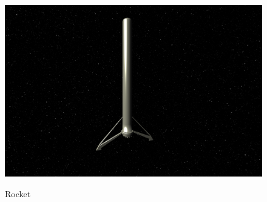 \documentclass[oneside]{article}
\begin{document}
\begin{enumerate}
	      \begin{figure}[b!]
	      	\begin{center}
	      		\label{rocket}
	      		\includegraphics[width=\linewidth]{shitty-rocket}
	      	\end{center}
	      	\caption{Rocket}
	      \end{figure}

\end{enumerate}
\end{document}

